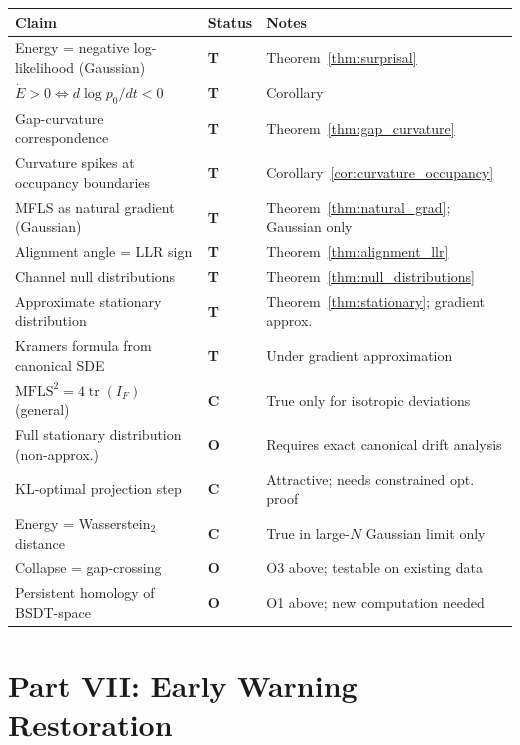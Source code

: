 \documentclass[11pt,a4paper]{article}
\theoremstyle{definition}
\begin{document}
\begin{center}
\renewcommand{\arraystretch}{1.3}
\begin{tabular}{p{6cm}p{2cm}p{5cm}}
\toprule
\textbf{Claim} & \textbf{Status} & \textbf{Notes} \\
\midrule
Energy = negative log-likelihood (Gaussian) & \textbf{T} & Theorem~\ref{thm:surprisal} \\
$\dot E > 0 \iff d\log p_0/dt < 0$ & \textbf{T} & Corollary \\
Gap-curvature correspondence & \textbf{T} & Theorem~\ref{thm:gap_curvature} \\
Curvature spikes at occupancy boundaries & \textbf{T} & Corollary~\ref{cor:curvature_occupancy} \\
MFLS as natural gradient (Gaussian) & \textbf{T} & Theorem~\ref{thm:natural_grad}; Gaussian only \\
Alignment angle = LLR sign & \textbf{T} & Theorem~\ref{thm:alignment_llr} \\
Channel null distributions & \textbf{T} & Theorem~\ref{thm:null_distributions} \\
Approximate stationary distribution & \textbf{T} & Theorem~\ref{thm:stationary}; gradient approx. \\
Kramers formula from canonical SDE & \textbf{T} & Under gradient approximation \\
$\mathrm{MFLS}^2 = 4\operatorname{tr}(I_F)$ (general) & \textbf{C} & True only for isotropic deviations \\
Full stationary distribution (non-approx.) & \textbf{O} & Requires exact canonical drift analysis \\
KL-optimal projection step & \textbf{C} & Attractive; needs constrained opt. proof \\
Energy = Wasserstein$_2$ distance & \textbf{C} & True in large-$N$ Gaussian limit only \\
Collapse = gap-crossing & \textbf{O} & O3 above; testable on existing data \\
Persistent homology of BSDT-space & \textbf{O} & O1 above; new computation needed \\
\bottomrule
\end{tabular}
\end{center}

\newpage
\part*{Part VII: Early Warning Restoration}
\end{document}
